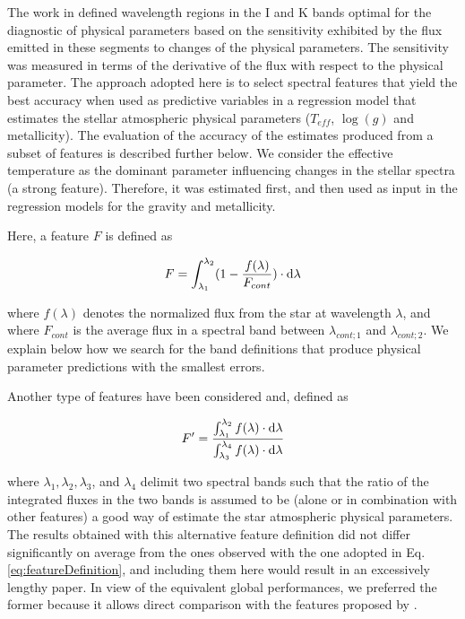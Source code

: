 The work in \cite{cesetti} defined wavelength regions in the I and K
bands optimal for the diagnostic of physical parameters based on the
sensitivity exhibited by the flux emitted in these segments to changes
of the physical parameters. The sensitivity was measured in terms of
the derivative of the flux with respect to the physical parameter. The
approach adopted here is to select spectral features that yield the
best accuracy when used as predictive variables in a regression model
that estimates the stellar atmospheric physical parameters ($T_{eff}$,
$\log(g)$ and metallicity). The evaluation of the accuracy of the
estimates produced from a subset of features is described further
below. 
We consider the effective temperature as the dominant parameter
influencing changes in the stellar spectra (a strong feature). Therefore,
it was estimated first, and then used as input in the regression
models for the gravity and metallicity.

Here, a feature $F$ is defined as

\begin{equation}\label{eq:featureDefinition}
  F = \int_{\lambda_{1}}^{\lambda_{2}} (1-\frac{f(\lambda)}{F_{cont}}) \cdot {\rm d}{\lambda}
\end{equation}

\zeroindent{}
where $f(\lambda)$ denotes the normalized flux from the star at
wavelength $\lambda$, and where $F_{cont}$ is the average flux in a
spectral band between $\lambda_{cont;1}$ and $\lambda_{cont;2}$. We
explain below how we search for the band definitions that produce
physical parameter predictions with the smallest errors.

Another type of features have been considered and, defined as

\begin{equation}\label{eq:feature2}
  F' = \frac{ \int_{\lambda_{1}}^{\lambda_{2}}f(\lambda) \cdot {\rm d}{\lambda}}
               {\int_{\lambda_{3}}^{\lambda_{4}} f(\lambda) \cdot {\rm d}{\lambda}} 
\end{equation}

\zeroindent{}
where $\lambda_1, \lambda_2, \lambda_3$, and
$\lambda_4$ delimit two spectral bands such that the ratio of the
integrated fluxes in the two bands is assumed to be 
(alone or in combination with other features) 
a good way of estimate the star atmospheric
physical parameters. The results obtained with this alternative
feature definition did not differ significantly on average from the
ones observed with the one adopted in Eq. \ref{eq:featureDefinition},
and including them here would result in an excessively lengthy
paper. In view of the equivalent global performances, we preferred the
former because it allows direct comparison with the features proposed
by \cite{cesetti}.

